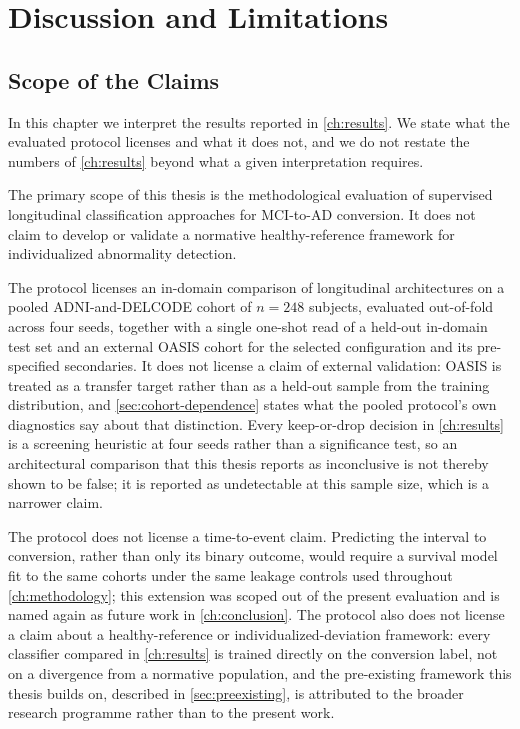 
\chapter{Discussion and Limitations}\label{ch:discussion}


\section{Scope of the Claims}\label{sec:scope-of-claims}

In this chapter we interpret the results reported in \autoref{ch:results}. We state what
the evaluated protocol licenses and what it does not, and we do not restate the numbers
of \autoref{ch:results} beyond what a given interpretation requires.

The primary scope of this thesis is the methodological evaluation of supervised
longitudinal classification approaches for \ac{MCI}-to-\ac{AD} conversion. It does not
claim to develop or validate a normative healthy-reference framework for individualized
abnormality detection.

The protocol licenses an in-domain comparison of longitudinal architectures on a pooled
\ac{ADNI}-and-\ac{DELCODE} cohort of $n=248$ subjects, evaluated out-of-fold across four
seeds, together with a single one-shot read of a held-out in-domain test set and an
external \ac{OASIS} cohort for the selected configuration and its pre-specified
secondaries. It does not license a claim of external validation: \ac{OASIS} is treated as
a transfer target rather than as a held-out sample from the training distribution, and
\autoref{sec:cohort-dependence} states what the pooled protocol's own diagnostics say about
that distinction. Every keep-or-drop decision in \autoref{ch:results} is a screening
heuristic at four seeds rather than a significance test, so an architectural comparison
that this thesis reports as inconclusive is not thereby shown to be false; it is reported
as undetectable at this sample size, which is a narrower claim.

The protocol does not license a time-to-event claim. Predicting the interval to conversion,
rather than only its binary outcome, would require a survival model fit to the same
cohorts under the same leakage controls used throughout \autoref{ch:methodology}; this
extension was scoped out of the present evaluation and is named again as future work in
\autoref{ch:conclusion}. The protocol also does not license a claim about a
healthy-reference or individualized-deviation framework: every classifier compared in
\autoref{ch:results} is trained directly on the conversion label, not on a divergence from
a normative population, and the pre-existing framework this thesis builds on, described in
\autoref{sec:preexisting}, is attributed to the broader research programme rather than to
the present work.

